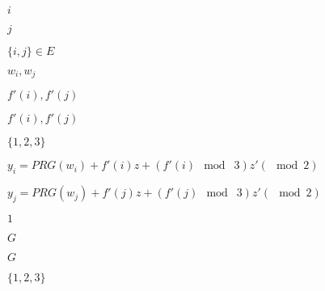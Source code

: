 \documentclass[10pt]{book}
\begin{document}
\begin{mdSnippets}
\begin{mdInlineSnippet}[865c0c0b4ab0e063e5caa3387c1a8741]
$i$\end{mdInlineSnippet}%
\begin{mdInlineSnippet}[363b122c528f54df4a0446b6bab05515]%
$j$\end{mdInlineSnippet}%
\begin{mdInlineSnippet}[321e8be9a994456a2d7febe17e8f51d5]%
$\{i,j\}\in E$\end{mdInlineSnippet}%
\begin{mdInlineSnippet}[9d66b5380a1702859617b42a06f59053]%
$w_i,w_j$\end{mdInlineSnippet}%
\begin{mdInlineSnippet}[c1a25628b4ffe5de632d3ed76c6a8c0f]%
$f'(i),f'(j)$\end{mdInlineSnippet}%
\begin{mdInlineSnippet}[c1a25628b4ffe5de632d3ed76c6a8c0f]%
$f'(i),f'(j)$\end{mdInlineSnippet}%
\begin{mdInlineSnippet}[1d4734bc6db8002e08e28eec76ab0b7a]%
$\{1,2,3\}$\end{mdInlineSnippet}%
\begin{mdInlineSnippet}[a3b48626cd7d9e0ddcecc07882e86e83]%
$y_i = PRG(w_i)+f'(i)z +(f'(i) \mod\; 3)z' (\mod 2)$\end{mdInlineSnippet}%
\begin{mdInlineSnippet}%
$y_j = PRG(w_j)+f'(j)z +(f'(j) \mod\; 3)z' (\mod 2)$\end{mdInlineSnippet}%
\begin{mdInlineSnippet}[c4ca4238a0b923820dcc509a6f75849b]%
$1$\end{mdInlineSnippet}%
\begin{mdInlineSnippet}[dfcf28d0734569a6a693bc8194de62bf]%
$G$\end{mdInlineSnippet}%
\begin{mdInlineSnippet}[dfcf28d0734569a6a693bc8194de62bf]%
$G$\end{mdInlineSnippet}%
\begin{mdInlineSnippet}[1d4734bc6db8002e08e28eec76ab0b7a]%
$\{1,2,3\}$\end{mdInlineSnippet}%
\begin{mdInlineSnippet}%

\end{mdInlineSnippet}
\end{mdSnippets}
\end{document}
